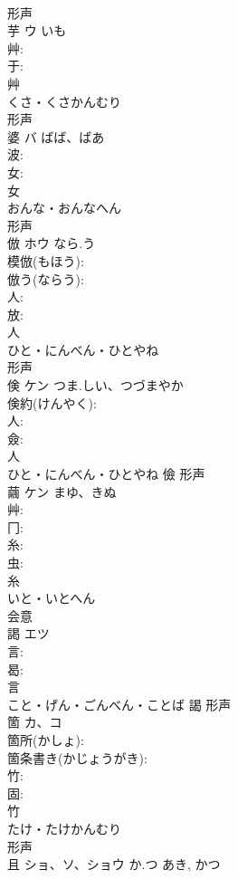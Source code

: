 \documentclass[8pt]{extreport}
\begin{document}
\begin{CJK}{UTF8}{min}
\\	形声 
\\	芋	ウ	いも		
\\	艸: 
\\	于: 
\\	艸	
\\	くさ・くさかんむり	
\\	形声 
\\	婆	バ	ばば、ばあ		
\\	波: 
\\	女: 
\\	女	
\\	おんな・おんなへん	
\\	形声 
\\	倣	ホウ	なら.う		
\\	模倣(もほう): 
\\	倣う(ならう): 
\\	人: 
\\	放: 
\\	人	
\\	ひと・にんべん・ひとやね	
\\	形声 
\\	倹	ケン	つま.しい、つづまやか		
\\	倹約(けんやく): 
\\	人: 
\\	僉: 
\\	人	
\\	ひと・にんべん・ひとやね	儉	形声 
\\	繭	ケン	まゆ、きぬ		
\\	艸: 
\\	冂: 
\\	糸: 
\\	虫: 
\\	糸	
\\	いと・いとへん	
\\	会意 
\\	謁	エツ			
\\	言: 
\\	曷: 
\\	言	
\\	こと・げん・ごんべん・ことば	謁	形声 
\\	箇	カ、コ			
\\	箇所(かしょ): 
\\	箇条書き(かじょうがき): 
\\	竹: 
\\	固: 
\\	竹	
\\	たけ・たけかんむり	
\\	形声 
\\	且	ショ、ソ、ショウ	か.つ	あき, かつ	

\end{CJK}
\end{document}
